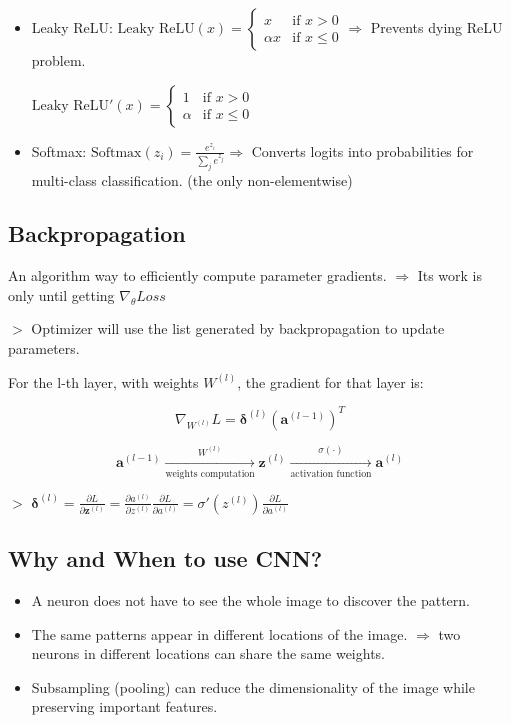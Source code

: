 \documentclass[12pt,a4paper]{article}
\newcommand{\remark}[1]{
    $>$ {\color{blue} #1}
}
\begin{document}
\begin{itemize}
    \remark{It makes training deep neural networks much easier.}

    \item Leaky ReLU: $\text{Leaky ReLU}(x) = \begin{cases}
    x & \text{if } x > 0\\
    \alpha x & \text{if } x \le 0
    \end{cases} \Rightarrow$ Prevents dying ReLU problem.

    $\text{Leaky ReLU}'(x) = \begin{cases}
    1 & \text{if } x > 0\\
    \alpha & \text{if } x \le 0
    \end{cases}$

    \item Softmax: $\text{Softmax}(z_i) = \frac{e^{z_i}}{\sum_{j} e^{z_j}} \Rightarrow$ Converts logits into probabilities for multi-class classification. (the only non-elementwise)
\end{itemize}

\subsection*{Backpropagation}

An algorithm way to efficiently compute parameter gradients. $\Rightarrow$ Its work is only until getting $\nabla_\theta Loss$

\remark{Optimizer will use the list generated by backpropagation to update parameters.}

For the l-th layer, with weights $W^{(l)}$, the gradient for that layer is:

\[\nabla_{W^{(l)}} L = \boldsymbol{\delta}^{(l)} (\mathbf{a}^{(l-1)})^T\]

\[\mathbf{a}^{(l-1)} \xrightarrow[\text{weights computation}]{W^{(l)}} \mathbf{z}^{(l)}
\xrightarrow[\text{activation function}]{\sigma(\cdot)} \mathbf{a}^{(l)}\]

\remark{$\boldsymbol{\delta}^{(l)} = \frac{\partial L}{\partial \mathbf{z}^{(l)}} = \frac{\partial a^{(l)}}{\partial z^{(l)}}\frac{\partial L}{\partial a^{(l)}} = \sigma'(z^{(l)})\frac{\partial L}{\partial a^{(l)}}$}

\subsection*{Why and When to use CNN?}

\begin{itemize}
    \item A neuron does not have to see the whole image to discover the pattern.
    \item The same patterns appear in different locations of the image. $\Rightarrow$ two neurons in different locations can share the same weights.
    \item Subsampling (pooling) can reduce the dimensionality of the image while preserving important features.
\end{itemize}
\end{document}
